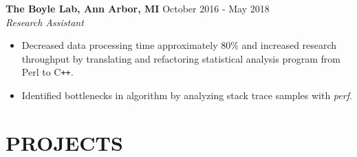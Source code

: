 \documentclass[overlapped]{res}
\begin{document}
\begin{resume}
\begin{itemize}
\end{itemize}

\textbf{The Boyle Lab, Ann Arbor, MI}
\hfill October 2016 - May 2018 \\
{\sl Research Assistant}
    \begin{itemize}  \itemsep -2pt %
    \item Decreased data processing time approximately 80\% 
    and increased research throughput
    by translating and refactoring statistical analysis program 
    from Perl to C\texttt{++}.
    
    \item Identified bottlenecks in algorithm by analyzing stack trace samples with \textit{perf}.
    
    

\end{itemize}

\section{PROJECTS}


\end{resume}
\end{document}
